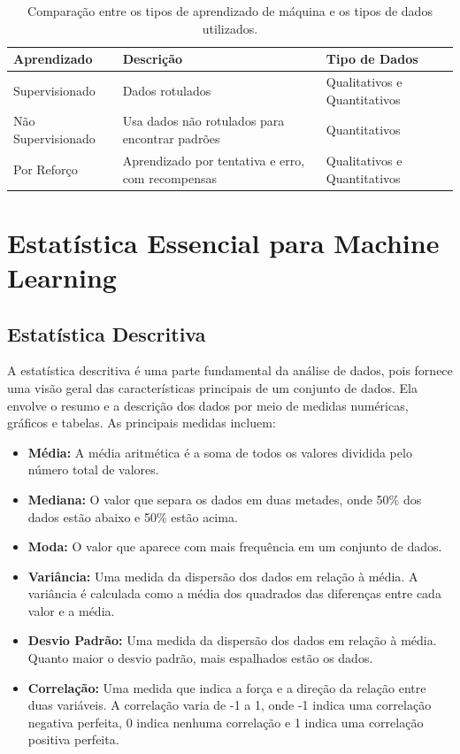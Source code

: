 \documentclass[a4paper,12pt,openany]{book}
\begin{document}
\begin{table}[ht]
    \centering
    \begin{tabular}{p{4cm} p{6cm} p{4cm}}
    \toprule
    \textbf{Aprendizado} & \textbf{Descrição} & \textbf{Tipo de Dados} \\ 
    \midrule
    Supervisionado & Dados rotulados & Qualitativos e Quantitativos\\
    Não Supervisionado & Usa dados não rotulados para encontrar padrões & Quantitativos \\
    Por Reforço & Aprendizado por tentativa e erro, com recompensas & Qualitativos e Quantitativos \\ 
    \bottomrule
    \end{tabular}
    \caption{Comparação entre os tipos de aprendizado de máquina e os tipos de dados utilizados.}
    \label{tab:tipos_aprendizado}
    \end{table}



\chapter{Estatística Essencial para Machine Learning}  

\section{Estatística Descritiva}
A estatística descritiva é uma parte fundamental da análise de dados, pois fornece uma visão geral das características principais de um conjunto de dados.
Ela envolve o resumo e a descrição dos dados por meio de medidas numéricas, gráficos e tabelas. As principais medidas incluem:
\begin{itemize}
    \item \textbf{Média:} A média aritmética é a soma de todos os valores dividida pelo número total de valores.
    \item \textbf{Mediana:} O valor que separa os dados em duas metades, onde 50\% dos dados estão abaixo e 50\% estão acima.
    \item \textbf{Moda:} O valor que aparece com mais frequência em um conjunto de dados.
    \item \textbf{Variância:} Uma medida da dispersão dos dados em relação à média. A variância é calculada como a média dos quadrados das diferenças entre cada valor e a média.
    \item \textbf{Desvio Padrão:} Uma medida da dispersão dos dados em relação à média. Quanto maior o desvio padrão, mais espalhados estão os dados.
    \item \textbf{Correlação:} Uma medida que indica a força e a direção da relação entre duas variáveis. A correlação varia de -1 a 1, onde -1 indica uma correlação negativa perfeita, 0 indica nenhuma correlação e 1 indica uma correlação positiva perfeita.
\end{itemize}
\end{document}

